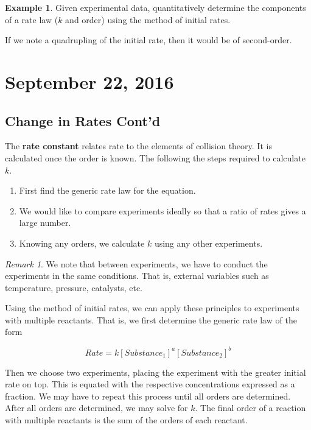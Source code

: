 \documentclass[11pt]{article}
\theoremstyle{plain} %
\theoremstyle{definition}
\theoremstyle{example}
\newtheorem*{example}{Example}
\theoremstyle{remark}
\newtheorem*{remark}{Remark}
\begin{document}
\begin{example}
Given experimental data, quantitatively determine the components of a rate law ($k$ and order) using the method of initial rates. 
\end{example}

If we note a quadrupling of the initial rate, then it would be of second-order. 


\section{September 22, 2016}

\subsection{Change in Rates Cont'd}

The \textbf{rate constant} relates rate to the elements of collision theory. It is calculated once the order is known. The following the steps required to calculate $k$.

\begin{enumerate}
\item First find the generic rate law for the equation.
\item We would like to compare experiments ideally so that a ratio of rates gives a large number. \item Knowing any orders, we calculate $k$ using any other experiments. 
\end{enumerate}

\begin{remark}
We note that between experiments, we have to conduct the experiments in the same conditions. That is, external variables such as temperature, pressure, catalysts, etc. 
\end{remark}

Using the method of initial rates, we can apply these principles to experiments with multiple reactants. That is, we first determine the generic rate law of the form 

$$Rate = k[Substance_1]^a[Substance_2]^b$$

Then we choose two experiments, placing the experiment with the greater initial rate on top. This is equated with the respective concentrations expressed as a fraction. We may have to repeat this process until all orders are determined. After all orders are determined, we may solve for $k$. The final order of a reaction with multiple reactants is the sum of the orders of each reactant. 
\end{document}
